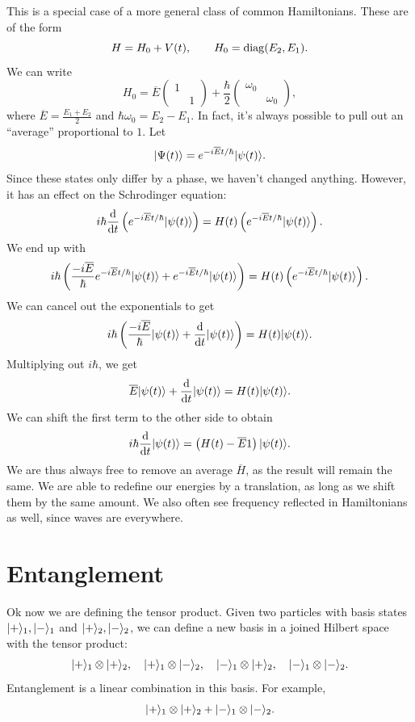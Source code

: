 This is a special case of a more general class of common Hamiltonians. These are of the form
\[
	H=H_0+V(t),\qquad H_0=\operatorname{diag} (E_2,E_1)
.\]
We can write
\[
	H_0=\overline{E} \begin{pmatrix}
	1 &  \\
	 & 1
	\end{pmatrix}+\frac{\hbar }{2} \begin{pmatrix}
	\omega _0 &  \\
	 & \omega _0
	\end{pmatrix}
,\]
where $\overline{E} =\frac{E_1+E_2}{2} $ and $\hbar \omega _0=E_2-E_1$. In fact, it's always possible to pull out an ``average'' proportional to $1$. Let
\[
	\lvert\Psi (t)\rangle =e^{-i \overline{E} t/\hbar } \lvert\psi (t)\rangle 
.\]
Since these states only differ by a phase, we haven't changed anything. However, it has an effect on the Schrodinger equation:
\[
	i\hbar \frac{\mathrm{d}}{\mathrm{d}t} \left( e^{-i \overline{E} t/\hbar } \lvert\psi (t)\rangle  \right) =H(t)\left( e^{-i \overline{E} t/\hbar } \lvert\psi (t)\rangle  \right) 
.\]
We end up with
\[
	i\hbar \left(\frac{-i\overline{E} }{\hbar }  e^{-i \overline{E} t/\hbar } \lvert\psi (t)\rangle +e^{-i \overline{E} t/\hbar } \lvert\psi (t)\rangle \right)=H(t)\left( e^{-i \overline{E} t/\hbar } \lvert\psi (t)\rangle  \right) 
.\]
We can cancel out the exponentials to get
\[
	i\hbar \left( \frac{-i \overline{E} }{\hbar } \lvert\psi (t)\rangle +\frac{\mathrm{d}}{\mathrm{d}t} \lvert\psi (t)\rangle  \right) =H(t)\lvert\psi (t)\rangle 
.\]
Multiplying out $i\hbar $, we get
\[
	\overline{E} \lvert\psi (t)\rangle +\frac{\mathrm{d}}{\mathrm{d}t} \lvert\psi (t)\rangle =H(t)\lvert\psi (t)\rangle 
.\]
We can shift the first term to the other side to obtain
\[
	i\hbar \frac{\mathrm{d}}{\mathrm{d}t} \lvert\psi (t)\rangle =\left( H(t)-\overline{E}1  \right) \lvert\psi (t)\rangle 
.\]
We are thus always free to remove an average $\overline{H} $, as the result will remain the same. We are able to redefine our energies by a translation, as long as we shift them by the same amount. We also often see frequency reflected in Hamiltonians as well, since waves are everywhere.
\chapter{Entanglement}
Ok now we are defining the tensor product. Given two particles with basis states $\lvert+\rangle _1,\lvert-\rangle_1 $ and $\lvert+\rangle _2,\lvert-\rangle_2$, we can define a new basis in a joined Hilbert space with the tensor product:
\[
	\lvert+\rangle_1\otimes \lvert+\rangle_2,\quad \lvert+\rangle_1\otimes \lvert-\rangle _2,\quad \lvert-\rangle _1\otimes \lvert+\rangle _2 ,\quad \lvert-\rangle _1\otimes \lvert-\rangle _2
.\]
Entanglement is a linear combination in this basis. For example,
\[
	\lvert+\rangle_1\otimes \lvert+\rangle _2 + \lvert-\rangle _1\otimes \lvert-\rangle _2
.\]

